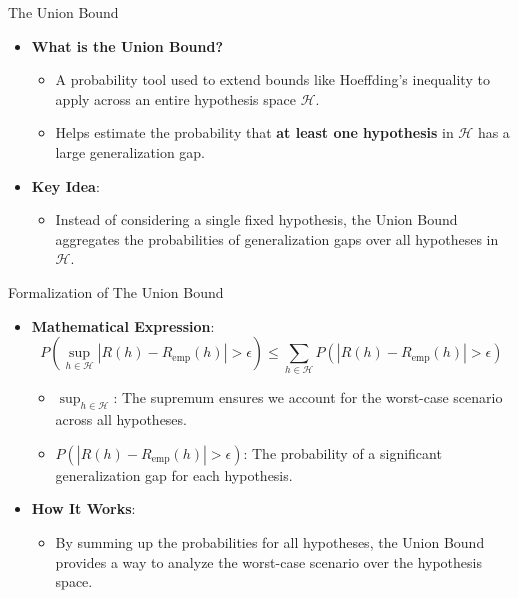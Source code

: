 \documentclass[
  ignorenonframetext,
]{beamer}
\providecommand{\tightlist}{%
  \setlength{\itemsep}{0pt}\setlength{\parskip}{0pt}}\usepackage{longtable,booktabs,array}
\begin{document}
\begin{frame}{The Union Bound}
\label{the-union-bound}
\begin{itemize}
\tightlist
\item
  \textbf{What is the Union Bound?}

  \begin{itemize}
  \tightlist
  \item
    A probability tool used to extend bounds like Hoeffding's inequality
    to apply across an entire hypothesis space \(\mathcal{H}\).
  \item
    Helps estimate the probability that \textbf{at least one hypothesis}
    in \(\mathcal{H}\) has a large generalization gap.
  \end{itemize}
\item
  \textbf{Key Idea}:

  \begin{itemize}
  \tightlist
  \item
    Instead of considering a single fixed hypothesis, the Union Bound
    aggregates the probabilities of generalization gaps over all
    hypotheses in \(\mathcal{H}\).
  \end{itemize}
\end{itemize}
\end{frame}

\begin{frame}{Formalization of The Union Bound}
\label{formalization-of-the-union-bound}
\begin{itemize}
\tightlist
\item
  \textbf{Mathematical Expression}: \[
  P\left(\sup_{h \in \mathcal{H}} |R(h) - R_{\text{emp}}(h)| > \epsilon \right) \leq \sum_{h \in \mathcal{H}} P\left(|R(h) - R_{\text{emp}}(h)| > \epsilon \right)
  \]

  \begin{itemize}
  \tightlist
  \item
    \(\sup_{h \in \mathcal{H}}\): The supremum ensures we account for
    the worst-case scenario across all hypotheses.
  \item
    \(P(|R(h) - R_{\text{emp}}(h)| > \epsilon)\): The probability of a
    significant generalization gap for each hypothesis.
  \end{itemize}
\item
  \textbf{How It Works}:

  \begin{itemize}
  \tightlist
  \item
    By summing up the probabilities for all hypotheses, the Union Bound
    provides a way to analyze the worst-case scenario over the
    hypothesis space.
  \end{itemize}
\end{itemize}
\end{frame}
\end{document}
